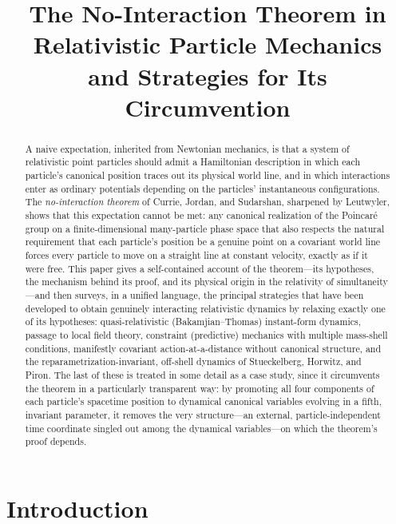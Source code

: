 \documentclass[11pt]{article}
\title{The No-Interaction Theorem in Relativistic Particle Mechanics\\
and Strategies for Its Circumvention}
\author{}
\date{}
\begin{document}
\maketitle

\begin{abstract}
\noindent
A naive expectation, inherited from Newtonian mechanics, is that a system of relativistic point particles should admit a Hamiltonian description in which each particle's canonical position traces out its physical world line, and in which interactions enter as ordinary potentials depending on the particles' instantaneous configurations. The \emph{no-interaction theorem} of Currie, Jordan, and Sudarshan, sharpened by Leutwyler, shows that this expectation cannot be met: any canonical realization of the Poincar\'e group on a finite-dimensional many-particle phase space that also respects the natural requirement that each particle's position be a genuine point on a covariant world line forces every particle to move on a straight line at constant velocity, exactly as if it were free. This paper gives a self-contained account of the theorem---its hypotheses, the mechanism behind its proof, and its physical origin in the relativity of simultaneity---and then surveys, in a unified language, the principal strategies that have been developed to obtain genuinely interacting relativistic dynamics by relaxing exactly one of its hypotheses: quasi-relativistic (Bakamjian--Thomas) instant-form dynamics, passage to local field theory, constraint (predictive) mechanics with multiple mass-shell conditions, manifestly covariant action-at-a-distance without canonical structure, and the reparametrization-invariant, off-shell dynamics of Stueckelberg, Horwitz, and Piron. The last of these is treated in some detail as a case study, since it circumvents the theorem in a particularly transparent way: by promoting all four components of each particle's spacetime position to dynamical canonical variables evolving in a fifth, invariant parameter, it removes the very structure---an external, particle-independent time coordinate singled out among the dynamical variables---on which the theorem's proof depends.
\end{abstract}

\tableofcontents

\section{Introduction}
\end{document}
